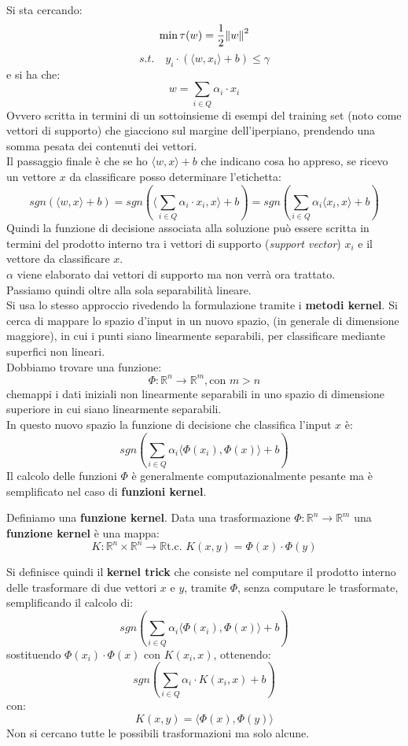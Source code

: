 Si sta cercando:
\[\min \tau(w)=\frac{1}{2}\norm{w}^2\]
\[s.t.\quad y_i\cdot(\langle w, x_i\rangle+b)\leq \gamma\]
e si ha che:
\[w=\sum_{i\in Q}\alpha_i\cdot x_i\]
Ovvero scritta in termini di un sottoinsieme di esempi del training set (noto
come vettori di supporto) che giacciono sul margine dell’iperpiano, prendendo
una somma pesata dei contenuti dei vettori.\\
Il passaggio finale è che se ho $\langle w, x\rangle+b$ che indicano cosa ho
appreso, se ricevo un vettore $x$ da classificare posso determinare l'etichetta:
\[sgn(\langle w, x\rangle+b)=sgn\left(\Big\langle\sum_{i\in Q}\alpha_i\cdot
    x_i, x\Big\rangle +b\right)=sgn\left(\sum_{i\in Q}\alpha_i\langle x_i, x\rangle
    +b\right)\]
Quindi la funzione di decisione associata alla soluzione può essere scritta in
termini del prodotto interno tra i vettori di supporto (\textit{support vector})
$x_i$ e il vettore da classificare $x$.\\
$\alpha$ viene elaborato dai vettori di supporto ma non verrà ora trattato.\\
Passiamo quindi oltre alla sola separabilità lineare.\\
Si usa lo stesso approccio rivedendo la formulazione tramite i \textbf{metodi
  kernel}. Si cerca di mappare lo spazio d'input in un nuovo spazio, (in
generale di dimensione maggiore), in cui i punti siano linearmente separabili,
per classificare mediante superfici non lineari.\\
Dobbiamo trovare una funzione:
\[\Phi:\mathbb{R}^n\to \mathbb{R}^m,\mbox{con }m>n\]
chemappi i dati iniziali non linearmente separabili in uno spazio di dimensione
superiore in cui siano linearmente separabili.\\
In questo nuovo spazio la funzione di decisione che classifica l'input $x$ è:
\[sgn\left(\sum_{i\in Q}\alpha_i\langle \Phi(x_i),\Phi(x)\rangle+b\right)\]
Il calcolo delle funzioni $\Phi$ è generalmente computazionalmente pesante ma è
semplificato nel caso di \textbf{funzioni kernel}.
\begin{definizione}
  Definiamo una \textbf{funzione kernel}. Data una trasformazione
  $\Phi:\mathbb{R}^n\to \mathbb{R}^m$ una \textbf{funzione kernel} è una mappa:
  \[K:\mathbb{R}^n\times \mathbb{R}^n\to \mathbb{R}\mbox{
      t.c. }K(x, y)=\Phi(x)\cdot \Phi(y)\]
\end{definizione}
\begin{definizione}
  Si definisce quindi il \textbf{kernel trick} che consiste nel computare il
  prodotto interno delle trasformare di due vettori $x$ e $y$, tramite $\Phi$,
  senza computare le trasformate, semplificando il calcolo di:
  \[sgn\left(\sum_{i\in Q}\alpha_i\langle \Phi(x_i),\Phi(x)\rangle+b\right)\]
  sostituendo $\Phi(x_i)\cdot\Phi(x)$ con $K(x_i, x)$, ottenendo:
  \[sgn\left(\sum_{i\in Q}\alpha_i\cdot K(x_i, x)+b\right)\]
  con:
  \[K(x, y)=\langle \Phi(x),\Phi(y)\rangle\]
  Non si cercano tutte le possibili trasformazioni ma solo alcune.
\end{definizione}

